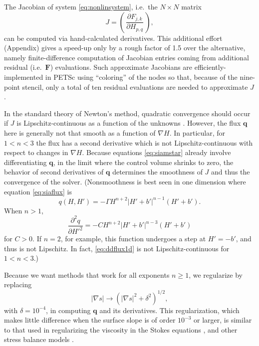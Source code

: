 \documentclass[twocolumn,letterpaper]{igs}
\newcommand\bq{\mathbf{q}}
\newcommand\bF{\mathbf{F}}
\newcommand{\grad}{\nabla}
\begin{document}
The Jacobian of system \eqref{eq:nonlinsystem}, i.e.~the $N\times N$ matrix
\begin{equation}
J = \left(\,\frac{\partial F_{j,k}}{\partial H_{p,q}}\,\right), \label{eq:nonlinjacobian}
\end{equation}
can be computed via hand-calculated derivatives.  This additional effort (Appendix) gives a speed-up only by a rough factor of 1.5 over the alternative, namely finite-difference computation of Jacobian entries coming from additional residual (i.e.~$\bF$) evaluations.  Such approximate Jacobians are efficiently-implemented in PETSc using ``coloring'' of the nodes \citep{CurtisPowellReid1974} so that, because of the nine-point stencil, only a total of ten residual evaluations are needed to approximate $J$.

In the standard theory of Newton's method, quadratic convergence should occur if $J$ is Lipschitz-continuous as a function of the unknowns \citep{Kelley2003}.  However, the flux $\bq$ here is generally not that smooth as a function of $\grad H$.  In particular, for $1<n<3$ the flux has a second derivative which is not Lipschitz-continuous with respect to changes in $\grad H$.  Because equations \eqref{eq:siamstar} already involve differentiating $\bq$, in the limit where the control volume shrinks to zero, the behavior of second derivatives of $\bq$ determines the smoothness of $J$ and thus the convergence of the solver.  (Nonsmoothness is best seen in one dimension where equation \eqref{eq:siaflux} is
\begin{equation}
q(H,H') = - \Gamma H^{n+2} \left|H'+b'\right|^{n-1} (H'+b'). \label{eq:flux1d}
\end{equation}
When $n>1$,
\begin{equation}
\frac{\partial^2 q}{\partial H'^2} = - C H^{n+2} \left|H'+b'\right|^{n-3} (H'+b') \label{eq:ddflux1d}
\end{equation}
for $C>0$.  If $n=2$, for example, this function undergoes a step at $H'=-b'$, and thus is not Lipschitz.  In fact, \eqref{eq:ddflux1d} is not Lipschitz-continuous for $1<n<3$.)

Because we want methods that work for all exponents $n\ge 1$, we regularize by replacing
\begin{equation}
|\grad s| \to \left(|\grad s|^2 + \delta^2\right)^{1/2}, \label{eq:nonlinregularization}
\end{equation}
with $\delta = 10^{-4}$, in computing $\bq$ and its derivatives.  This regularization, which makes little difference when the surface slope is of order $10^{-3}$ or larger, is similar to that used in regularizing the viscosity in the Stokes equations \citep{GreveBlatter2009}, and other stress balance models \citep[for example]{BrownSmithAhmadia2013,BuelerBrown2009}.
\end{document}
